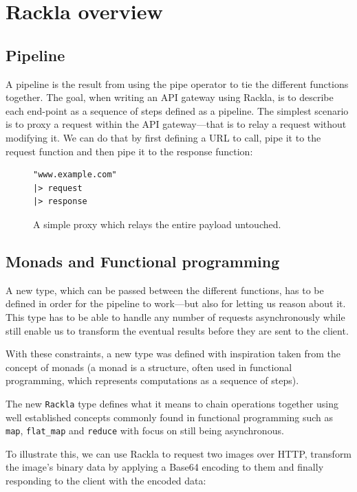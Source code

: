 \documentclass{cslthse-msc}
\begin{document}
\section{Rackla overview}

\subsection{Pipeline}
A pipeline is the result from using the pipe operator to tie the different functions together. The goal, when writing an API gateway using Rackla, is to describe each end-point as a sequence of steps defined as a pipeline. The simplest scenario is to proxy a request within the API gateway---that is to relay a request without modifying it. We can do that by first defining a URL to call, pipe it to the request function and then pipe it to the response function:

\begin{figure}[H]
  \centering
\begin{lstlisting}[breaklines=true,frame=single]
"www.example.com"
|> request
|> response
\end{lstlisting}
  \caption{A simple proxy which relays the entire payload untouched.}
\end{figure}

\subsection{Monads and Functional programming}
A new type, which can be passed between the different functions, has to be defined in order for the pipeline to work---but also for letting us reason about it. This type has to be able to handle any number of requests asynchronously while still enable us to transform the eventual results before they are sent to the client.

With these constraints, a new type was defined with inspiration taken from the concept of monads (a monad is a structure, often used in functional programming, which represents computations as a sequence of steps).

The new \lstinline{Rackla} type defines what it means to chain operations together using well established concepts commonly found in functional programming such as \lstinline{map}, \lstinline{flat_map} and \lstinline{reduce} with focus on still being asynchronous.

To illustrate this, we can use Rackla to request two images over HTTP, transform the image's binary data by applying a Base64 encoding to them and finally responding to the client with the encoded data:
\end{document}
